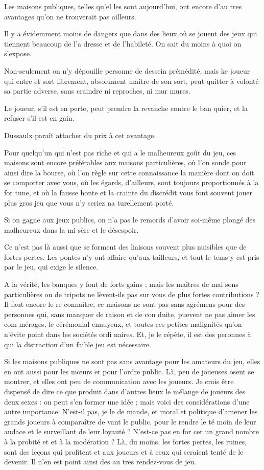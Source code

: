 Les maisons publiques, telles qu'el%
les sont aujourd'hui, ont encore d'au%
tres avantages qu'on ne trouverait
pas ailleurs.

Il y a évidemment moins de dangers
que dans des lieux où se jouent des
jeux qui tiennent beaucoup de l'a%
dresse et de l'habileté. On sait du
moins à quoi on s'expose.

Non-seulement on n'y dépouille
personne de dessein prémédité, mais
ke joueur qui entre et sort librement,
absolument maître de son sort, peut
quitter à volonté sa partie adverse,
sans craindre ni reproches, ni mur%
mures.

Le joueur, s'il est en perte, peut
prendre la revanche contre le ban%
quier, et la refuser s'il est en gain.

Dussaulx paraît attacher du prix à
cet avantage.

Pour quelqu'un qui n'est pas riche
et qui a le malheureux goût du jeu,
ces maisons sont encore préférables
aux maisons particulières, où l'on
sonde pour ainsi dire la bourse, où
l'on règle sur cette connaissance la
manière dont on doit se comporter 
avec vous, où les égards, d'ailleurs,
sont toujours proportionnés à la for%
tune, et où la fausse honte et la crainte
du discrédit vous font souvent jouer
plus gros jeu que vous n'y seriez na%
turellement porté.

Si on gagne aux jeux publics, on
n'a pas le remords d'avoir soi-même
plongé des malheureux dans la mi%
sère et le désespoir.

Ce n'est pas là aussi que se forment
des liaisons souvent plus nuisibles
que de fortes pertes. Les pontes n'y
ont affaire qu'aux tailleurs, et tout
le tems y est pris par le jeu, qui exige 
le silence.

A la vérité, les banques y font de
forts gains ; mais les maîtres de mai%
sons particulières ou de tripots ne
lèvent-ils pas sur vous de plus fortes
contributions ? Il faut encore le re%
connaître, ce maisons ne sont pas
sans agrémens pour des personnes
qui, sans manquer de raison et de con%
duite, puevent ne pas aimer les com%
mérages, le cérémonial ennuyeux,
et toutes ces petites malignités qu'on
n'évite point dans les sociétés ordi%
naires. Et, je le répète, il est des 
peronnes à qui la distraction d'un
faible jeu est nécessaire.

Si les maisons publiques ne sont 
pas sans avantage pour les amateurs
du jeu, elles en ont aussi pour les
mœurs et pour l'ordre public. Là,
peu de joueuses osent se montrer, et
elles ont peu de communication avec
les joueurs. Je crois être dispensé de
dire ce que produit dans d'autres lieux
le mélange de joueurs des deux sexes :
on peut s'en former une idée ; mais
voici des considérations d'une autre
importance. N'est-il pas, je le de%
mande, et moral et politique d'amener
les grands joueurs à comparaître de%
vant le public, pour le rendre le té%
moin de leur audace et le surveillant
de leur loyauté ? N'est-ce pas en for%
cer un grand nombre à la probité et
et à la modération ? Là, du moins,
les fortes pertes, les ruines, sont des
leçons qui profitent et aux joueurs
et à ceux qui seraient tenté de le
devenir. Il n'en est point ainsi des au%
tres rendez-vous de jeu.

